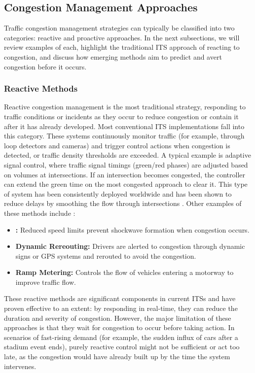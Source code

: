 \subsection{Congestion Management Approaches}
\label{link:cmt}
Traffic congestion management strategies can typically be classified into two categories: reactive and proactive approaches. In the next subsections, we will review examples of each, highlight the traditional ITS approach of reacting to congestion, and discuss how emerging methods aim to predict and avert congestion before it occurs.

\subsubsection{Reactive Methods}
Reactive congestion management is the most traditional strategy, responding to traffic conditions or incidents as they occur to reduce congestion or contain it after it has already developed. Most conventional ITS implementations fall into this category. These systems continuously monitor traffic (for example, through loop detectors and cameras) and trigger control actions when congestion is detected, or traffic density thresholds are exceeded. A typical example is adaptive signal control, where traffic signal timings (green/red phases) are adjusted based on volumes at intersections. If an intersection becomes congested, the controller can extend the green time on the most congested approach to clear it. This type of system has been consistently deployed worldwide and has been shown to reduce delays by smoothing the flow through intersections \cite{office_intelligent_nodate}. 
Other examples of these methods include \cite{office_intelligent_nodate}:
\begin{itemize}
    \item \textbf{:} Reduced speed limits prevent shockwave formation when congestion occurs.
    \item \textbf{Dynamic Rereouting:} Drivers are alerted to congestion through dynamic signs or GPS systems and rerouted to avoid the congestion.
    \item \textbf{Ramp Metering:} Controls the flow of vehicles entering a motorway to improve traffic flow.
\end{itemize}

These reactive methods are significant components in current ITSs and have proven effective to an extent: by responding in real-time, they can reduce the duration and severity of congestion. However, the major limitation of these approaches is that they wait for congestion to occur before taking action. In scenarios of fast-rising demand (for example, the sudden influx of cars after a stadium event ends), purely reactive control might not be sufficient or act too late, as the congestion would have already built up by the time the system intervenes.

